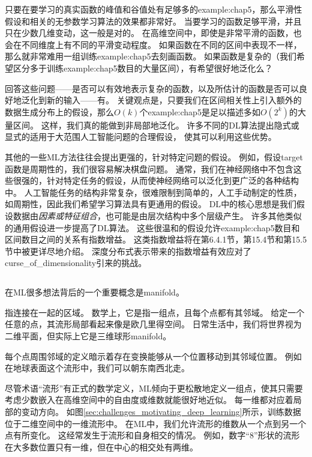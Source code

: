 
只要在要学习的真实函数的峰值和谷值处有足够多的\gls{example:chap5}，那么平滑性假设和相关的无参数学习算法的效果都非常好。
当要学习的函数足够平滑，并且只在少数几维变动，这一般是对的。
在高维空间中，即使是非常平滑的函数，也会在不同维度上有不同的平滑变动程度。
如果函数在不同的区间中表现不一样，那么就非常难用一组训练\gls{example:chap5}去刻画函数。
如果函数是复杂的（我们希望区分多于训练\gls{example:chap5}数目的大量区间），有希望很好地泛化么？

回答这些问题——是否可以有效地表示复杂的函数，以及所估计的函数是否可以良好地泛化到新的输入——有。
关键观点是，只要我们在区间相关性上引入额外的数据生成分布上的假设，那么$O(k)$个\gls{example:chap5}是足以描述多如$O(2^k)$的大量区间。
这样，我们真的能做到非局部地泛化\citep{Bengio+Monperrus-2005,NIPS2005_539}。
许多不同的\gls{DL}算法提出隐式或显式的适用于大范围人工智能问题的合理假设， 使其可以利用这些优势。

其他的一些\gls{ML}方法往往会提出更强的，针对特定问题的假设。
例如，假设\gls{target}函数是周期性的，我们很容易解决棋盘问题。
通常，我们在神经网络中不包含这些很强的，针对特定任务的假设，从而使神经网络可以泛化到更广泛的各种结构中。
人工智能任务的结构非常复杂，很难限制到简单的，人工手动制定的性质，如周期性，因此我们希望学习算法具有更通用的假设。
\gls{DL}中的核心思想是我们假设数据由\emph{因素或特征组合}，也可能是由层次结构中多个层级产生。
许多其他类似的通用假设进一步提高了\gls{DL}算法。
这些很温和的假设允许\gls{example:chap5}数目和区间数目之间的关系有指数增益。
这类指数增益将在第6.4.1节，第15.4节和第15.5节中被更详尽地介绍。
深度分布式表示带来的指数增益有效应对了\gls{curse_of_dimensionality}引来的挑战。


\subsection{}
\label{sec:manifold_learning}
在\gls{ML}很多想法背后的一个重要概念是\gls{manifold}。

指连接在一起的区域。
数学上，它是指一组点，且每个点都有其邻域。
给定一个任意的点，其流形局部看起来像是欧几里得空间。
日常生活中，我们将世界视为二维平面，但实际上它是三维球形\gls{manifold}。

每个点周围邻域的定义暗示着存在变换能够从一个位置移动到其邻域位置。
例如在地球表面这个流形中，我们可以朝东南西北走。

尽管术语``流形''有正式的数学定义，\gls{ML}倾向于更松散地定义一组点，使其只需要考虑少数嵌入在高维空间中的自由度或维数就能很好地近似。
每一维都对应着局部的变动方向。
如图\ref{sec:challenges_motivating_deep_learning}所示，训练数据位于二维空间中的一维流形中。
在\gls{ML}中，我们允许流形的维数从一个点到另一个点有所变化。
这经常发生于流形和自身相交的情况。
例如，数字``8''形状的流形在大多数位置只有一维，但在中心的相交处有两维。

